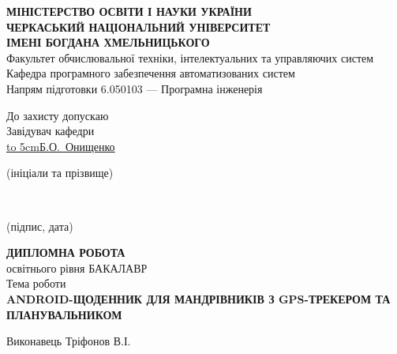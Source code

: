 \documentclass[../main.tex]{subfiles}
\begin{document}
	
	\begin{titlepage}
		\centering
		{\bfseries
		\MakeUppercase{Міністерство освіти і науки України} \\
		\MakeUppercase{Черкаський національний університет} \\
		\MakeUppercase{імені Богдана Хмельницького} \\}
		Факультет обчислювальної техніки, інтелектуальних та управляючих систем \\
		Кафедра програмного забезпечення автоматизованих систем \\
		Напрям підготовки 6.050103 — Програмна інженерія \\
		\begin{flushright}
			\begin{minipage}[t]{5cm}
				\begin{flushright}
					До захисту допускаю \\
					Завідувач кафедри \\
					\underline{\hbox to 5cm{\hfill Б.О.~Онищенко \hfill}} \\
					\vspace{-0.125\baselineskip}
					{\footnotesize\centering (ініціали та прізвище)\par}
					\hrulefill \\
					\vspace{-0.375\baselineskip}
					{\footnotesize\centering (підпис, дата)\par}
				\end{flushright}
			\end{minipage}
		\end{flushright}
		\vfill
		{\large %
		{\scshape\bfseries \MakeUppercase{Дипломна робота} \\}
		освітнього рівня БАКАЛАВР \\
		Тема роботи \\
		{\scshape\bfseries \MakeUppercase{Android-щоденник для мандрівників з GPS-трекером та планувальником} \\}
		}
		\vfill
		{\footnotesize
			\begin{flushright}
				\begin{minipage}[t]{4.2cm}
					\begin{flushright}
						Виконавець Тріфонов В.І. \\
					\end{flushright}

\end{minipage}
\end{flushright}}
\end{titlepage}
\end{document}
